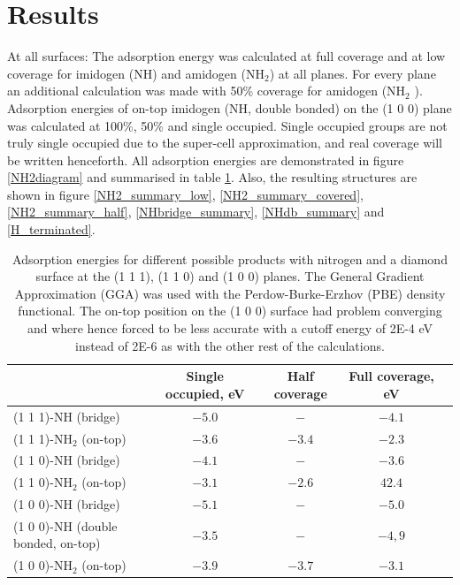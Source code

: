 \documentclass[10pt,a4paper]{article}
\begin{document}
\section{Results}
At all surfaces: The adsorption energy was calculated at full coverage and at low coverage for imidogen (NH) and amidogen (NH$_2$) at all planes. For every plane an additional calculation was made with 50\% coverage for amidogen (NH$_2$ ). Adsorption energies of on-top imidogen (NH, double bonded) on the (1 0 0) plane was calculated at 100\%, 50\% and single occupied. Single occupied groups are not truly single occupied due to the super-cell approximation, and real coverage will be written henceforth. All adsorption energies are demonstrated in figure \ref{NH2diagram} and summarised in table \ref{adsorptionEnergies}. Also, the resulting structures are shown in figure   \ref{NH2_summary_low}, \ref{NH2_summary_covered}, \ref{NH2_summary_half}, \ref{NHbridge_summary}, \ref{NHdb_summary} and \ref{H_terminated}. 

\begin{table}[!h] \caption{Adsorption energies for different possible products with nitrogen and a diamond surface at the (1 1 1), (1 1 0) and (1 0 0) planes. The General Gradient Approximation (GGA) was used with the Perdow-Burke-Erzhov (PBE) density functional. The on-top position on the (1 0 0) surface had problem converging and where hence forced to be less accurate with a cutoff energy of 2E-4 eV instead of 2E-6 as with the other rest of the calculations.} \label{adsorptionEnergies}
\begin{adjustbox}{max width=\textwidth}
\begin{tabular}{|l|c|c|c|c|}
								& Single occupied, eV	&  Half coverage 	& Full coverage, eV \\ \hline
(1 1 1)-NH (bridge)						&$-5.0$ 			& $- $			& $-4.1 $ \\ \hline
(1 1 1)-NH$_2$ (on-top)					&$-3.6$ 			& $-3.4 $  		& $-2.3 $ \\ \hline
(1 1 0)-NH (bridge)						&$-4.1$ 			& $- $  		& $-3.6 $ \\ \hline
(1 1 0)-NH$_2$ (on-top)					&$-3.1$ 			& $-2.6 $ 		& $42.4 $ \\ \hline
(1 0 0)-NH (bridge)						&$-5.1$ 			& $- $ 		& $-5.0 $ \\ \hline
(1 0 0)-NH (double bonded, on-top) 			&$-3.5$ 			& $- $ 		& $-4,9 $ \\ \hline
(1 0 0)-NH$_2$ (on-top)					&$-3.9$ 			& $-3.7 $ 		& $-3.1 $ \\ \hline
\end{tabular}
\end{adjustbox}
\end{table}
\end{document}

